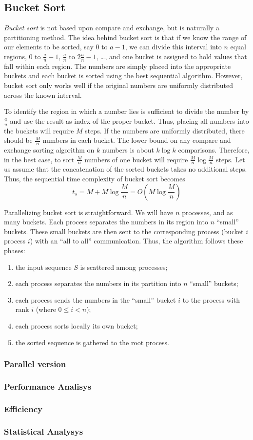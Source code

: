 \subsection{Bucket Sort}
\textit{Bucket sort} is not based upon compare and exchange, but is naturally a partitioning method. The idea behind bucket sort is that if we know the range of our elements to be sorted, say $0$ to $a-1$, we can divide this interval into $n$ equal regions, $0$ to $\frac{a}{n}-1$, $\frac{a}{n}$ to $2\frac{a}{n}-1$, \dots , and one bucket is assigned to hold values that fall within each region. The numbers are simply placed into the appropriate buckets and each bucket is sorted using the best sequential algorithm. However, bucket sort only works well if the original numbers are uniformly distributed across the known interval. 

To identify the region in which a number lies is sufficient to divide the number by $\frac{a}{n}$ and use the result as index of the proper bucket. Thus, placing all numbers into the buckets will require $M$ steps. If the numbers are uniformly distributed, there should be $\frac{M}{n}$ numbers in each bucket. The lower bound on any compare and exchange sorting algorithm on $k$ numbers is about $k \log k$ comparisons. Therefore, in the best case, to sort $\frac{M}{n}$ numbers of one bucket will require $\frac{M}{n} \log \frac{M}{n}$ steps. Let us assume that the concatenation of the sorted buckets takes no additional steps. Thus, the sequential time complexity of bucket sort becomes
\[
t_s = M + M \log \frac{M}{n} = O( M \log \frac{M}{n} )
\]

Parallelizing bucket sort is straightforward. We will have $n$ processes, and as many buckets. Each process separates the numbers in its region into $n$ ``small'' buckets. These small buckets are then sent to the corresponding process (bucket $i$ process $i$) with an ``all to all'' communication. Thus, the algorithm follows these phases:
\begin{enumerate}	
	\item the input sequence $S$ is scattered among processes;
	\item each process separates the numbers in its partition into $n$ ``small'' buckets;
	\item each process sends the numbers in the ``small'' bucket $i$ to the process with rank $i$ (where $0 \leq i < n$);
	\item each process sorts locally its own bucket;
	\item the sorted sequence is gathered to the root process.
\end{enumerate}

 
\subsubsection*{Parallel version}
\subsubsection*{Performance Analisys} 
\subsubsection*{Efficiency} 
\subsubsection*{Statistical Analysys}